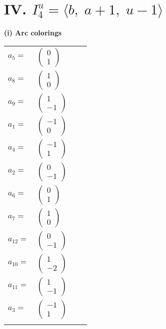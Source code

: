 \documentclass[1p]{elsarticle_modified}
\theoremstyle{definition}
\begin{document}
\centering \section*{IV. $I^u_{4}= \langle b,\;a+1,\;u-1 \rangle$}
\flushleft \textbf{(i) Arc colorings}\\
\begin{tabular}{m{7pt} m{180pt} m{7pt} m{180pt} }
\flushright $a_{5}=$&$\begin{pmatrix}0\\1\end{pmatrix}$ \\
\flushright $a_{8}=$&$\begin{pmatrix}1\\0\end{pmatrix}$ \\
\flushright $a_{9}=$&$\begin{pmatrix}1\\-1\end{pmatrix}$ \\
\flushright $a_{1}=$&$\begin{pmatrix}-1\\0\end{pmatrix}$ \\
\flushright $a_{4}=$&$\begin{pmatrix}-1\\1\end{pmatrix}$ \\
\flushright $a_{2}=$&$\begin{pmatrix}0\\-1\end{pmatrix}$ \\
\flushright $a_{6}=$&$\begin{pmatrix}0\\1\end{pmatrix}$ \\
\flushright $a_{7}=$&$\begin{pmatrix}1\\0\end{pmatrix}$ \\
\flushright $a_{12}=$&$\begin{pmatrix}0\\-1\end{pmatrix}$ \\
\flushright $a_{10}=$&$\begin{pmatrix}1\\-2\end{pmatrix}$ \\
\flushright $a_{11}=$&$\begin{pmatrix}1\\-1\end{pmatrix}$ \\
\flushright $a_{3}=$&$\begin{pmatrix}-1\\1\end{pmatrix}$\\&\end{tabular}
\end{document}
